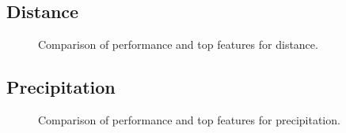 \subsection{Distance}

\begin{figure}[h]
    \centering
    \caption{Comparison of performance and top features for distance.}
    \label{fig:obs_distance_summary}
\end{figure}

\subsection{Precipitation}

\begin{figure}[h]
    \centering
    \caption{Comparison of performance and top features for precipitation.}
    \label{fig:obs_precipitation_summary}
\end{figure}